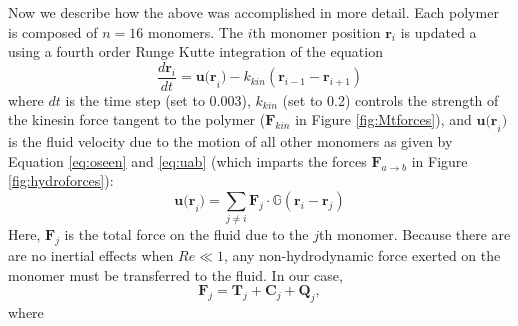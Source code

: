 \documentclass[11pt]{ucthesis}
\begin{document}
\noindent
Now we describe how the above was accomplished in more detail.
Each polymer is composed of $n=16$ monomers. The $i$th monomer
position $\mathbf{r}_i$ is updated a using a fourth order Runge
Kutte integration of the equation
\begin{equation}
\frac{d\mathbf{r}_i}{dt} = \mathbf{u(r}_i) - k_{kin}\left(\textbf{r}_{i-1} - \textbf{r}_{i+1}\right)
\end{equation}
where $dt$ is the time step (set to 0.003), $k_{kin}$ (set to 0.2)
controls the strength of the kinesin force tangent to the polymer
($\mathbf{F}_{kin}$ in Figure \ref{fig:Mtforces}), and $\mathbf{u(r}_i)$
is the fluid velocity due to the motion of all other monomers as
given by Equation \ref{eq:oseen} and \ref{eq:uab} (which imparts
the forces $\mathbf{F}_{a\rightarrow b}$ in Figure \ref{fig:hydroforces}):
\begin{equation}
\mathbf{u(r}_i) = \sum_{j\neq i} \mathbf{F}_j \cdot \mathbb{G}(\mathbf{r}_i-\mathbf{r}_j)
\end{equation}
Here, $\mathbf{F}_j$ is the total force on the fluid due to the $j$th monomer. Because there are are no inertial effects when $Re\ll 1$, any non-hydrodynamic force exerted on the monomer must be transferred to the fluid. In our case,
\begin{equation}
\mathbf{F}_j = \mathbf{T}_j + \mathbf{C}_j + \mathbf{Q}_j,
\end{equation} 
where
\end{document}
